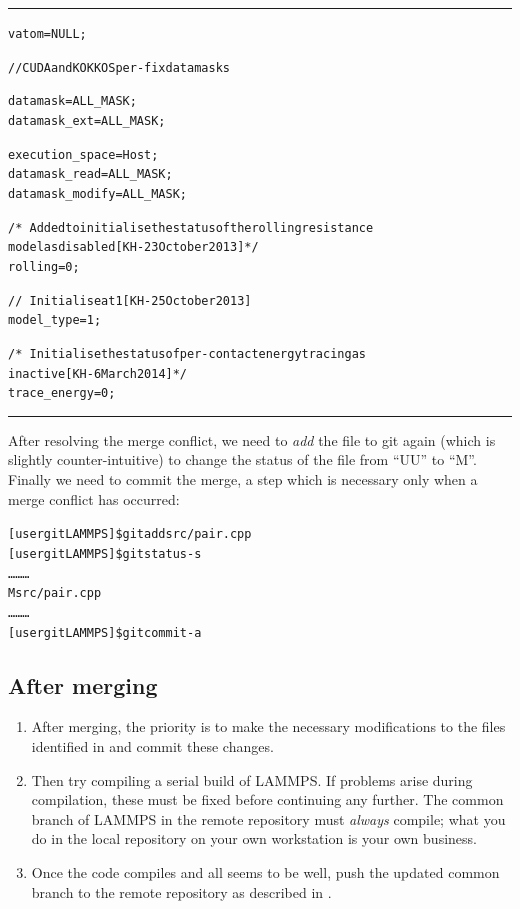 \documentclass[a4paper,oneside,11pt]{article}
\begin{document}
\noindent\textcolor{customblue}{\rule{8cm}{0.8pt}}
\begin{alltt}
  vatom = NULL;

  // CUDA and KOKKOS per-fix data masks

  datamask = ALL_MASK;
  datamask_ext = ALL_MASK;

  execution_space = Host;
  datamask_read = ALL_MASK;
  datamask_modify = ALL_MASK;

  /*~ Added to initialise the status of the rolling resistance
    model as disabled [KH - 23 October 2013]*/
  rolling = 0;

  //~ Initialise at 1 [KH - 25 October 2013]
  model_type = 1;

  /*~ Initialise the status of per-contact energy tracing as
    inactive [KH - 6 March 2014]*/
  trace_energy = 0;
\end{alltt}
\noindent\textcolor{customblue}{\rule{8cm}{0.8pt}}

After resolving the merge conflict, we need to \emph{add} the file to git again (which is slightly counter-intuitive) to change the status of the file from ``UU'' to ``M''. Finally we need to commit the merge, a step which is necessary only when a merge conflict has occurred:
\begin{alltt}
[user gitLAMMPS]\$ git add src/pair.cpp
[user gitLAMMPS]\$ git status -s
\ldots\hspace*{10em}\ldots\hspace*{10em}\ldots
M  src/pair.cpp
\ldots\hspace*{10em}\ldots\hspace*{10em}\ldots
[user gitLAMMPS]\$ git commit -a
\end{alltt}

\subsection{After merging}
\begin{enumerate}
  \item After merging, the priority is to make the necessary modifications to the files identified in  and commit these changes.
  \item Then try compiling a serial build of LAMMPS. If problems arise during compilation, these must be fixed before continuing any further. The common branch of LAMMPS in the remote repository must \emph{always} compile; what you do in the local repository on your own workstation is your own business.
  \item Once the code compiles and all seems to be well, push the updated common branch to the remote repository as described in .
\end{enumerate}
\end{document}
